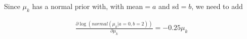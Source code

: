 \documentclass[12pt]{article}
\begin{document}
Since $\mu_k$ has a normal prior with, with mean$=a$ and sd$=b$, we need to add 

\begin{align*}
\frac{\partial \log(normal(\mu_k | a=0, b=2))}{\partial \mu_k} = -0.25 \mu_k
\end{align*}













% 
\end{document}
